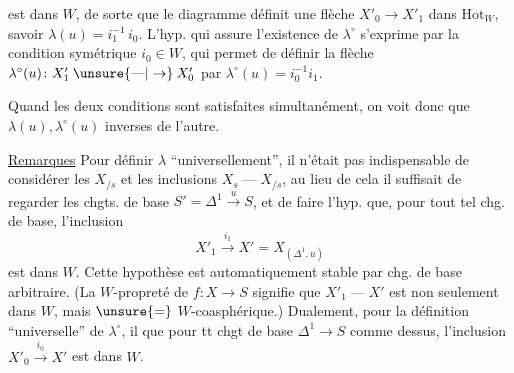 
est dans $W$, de sorte que le diagramme
définit une flèche  $X'_0\to X'_1$\unsure{,} dans $\mathrm{Hot}_W$, savoir $\lambda(u)=i_1^{-1}\,i_0$. L'hyp. qui assure l'existence de $\lambda^\circ$ s'exprime par la condition symétrique $i_0\in W$, qui permet de définir la flèche $\lambda^\circ(u)\colon X'_1\mathbin{\unsure{\text{---}|\to}}X'_0$ par $\lambda^\circ(u)=i_0^{-1}i_1$.

Quand les deux conditions sont satisfaites simultanément, on voit donc que $\lambda(u),\lambda^\circ(u)$  inverses  de l'autre.

\uline{Remarques} Pour définir $\lambda$ ``universellement'', il n'était pas indispensable de considérer les $X_{/s}$ et les inclusions $X_s\mathbin{\text{---}}X_{/s}$, au lieu de cela il suffisait de regarder les chgts. de base $S'=\mathbb{\Delta}^1\xrightarrow{u}S$, et de faire l'hyp. que, pour tout tel chg. de base, l'inclusion
\[
X'_1\xrightarrow{i_1}X'=X_{(\mathbb{\Delta}^{1},u)}
\]
est dans $W$. Cette hypothèse est automatiquement stable par chg. de base arbitraire. (La $W$-propreté de $f\colon X\to S$ signifie que $X'_1\mathbin{\text{---}}X'$ est non seulement dans $W$, mais $\unsure{=}$ $W$-coasphérique.) Dualement, pour la définition ``universelle'' de $\lambda^\circ$, il  que pour tt chgt de base $\mathbb{\Delta}^1\to S$ comme dessus, l'inclusion $X'_0\xrightarrow{i_0}X'$ est dans $W$.

